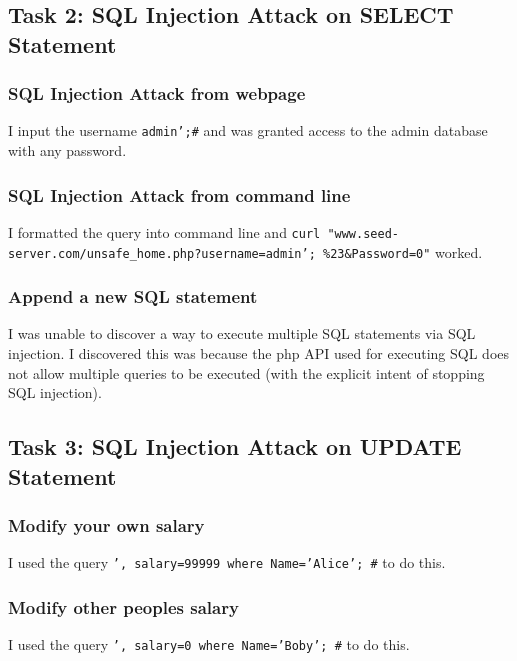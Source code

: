 \documentclass[10pt,\jkfside,a4paper]{article}
\begin{document}
\subsection{Task 2: SQL Injection Attack on SELECT Statement}

\subsubsection{SQL Injection Attack from webpage}

I input the username \texttt{admin';\#} and was granted access to the
admin database with any password.

\subsubsection{SQL Injection Attack from command line}

I formatted the query into command line and
\texttt{curl "www.seed-server.com/unsafe\_home.php?username=admin';
\%23\&Password=0"}
worked.

\subsubsection{Append a new SQL statement}

I was unable to discover a way to execute multiple SQL statements via SQL
injection. I discovered this was because the php API used for executing SQL
does not allow multiple queries to be executed (with the explicit intent of
stopping SQL injection).

\subsection{Task 3: SQL Injection Attack on UPDATE Statement}

\subsubsection{Modify your own salary}

I used the query \texttt{', salary=99999 where Name='Alice'; \#} to do this.

\subsubsection{Modify other peoples salary}

I used the query \texttt{', salary=0 where Name='Boby'; \#} to do this.
\end{document}
